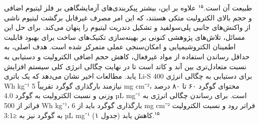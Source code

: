 \documentclass[12pt,a4paper,twocolumn]{article} %
\newcommand{\persian}[1]{\textfarsi{#1}}
\newcommand{\english}[1]{\textenglish{#1}}
\begin{document}
\persian{
طبیعت آن است.$^{۱۵}$ علاوه بر این، بیشتر پیکربندی‌های آزمایشگاهی بر فلز لیتیوم اضافی و حجم بالای الکترولیت متکی هستند، که این امر مصرف غیرقابل برگشت لیتیوم ناشی از واکنش‌های جانبی پلی‌سولفید و تشکیل دندریت لیتیوم را پنهان می‌کند. برای حل این مسائل، تلاش‌های پژوهشی کنونی بر بهینه‌سازی تکنیک‌های ساخت برای بهبود قابلیت اطمینان الکتروشیمیایی و امکان‌سنجی عملی متمرکز شده است. هدف اصلی، به حداقل رساندن استفاده از مواد غیرفعال، کاهش حجم اضافی الکترولیت و دستیابی به نسبت متعادل‌تری بین آند و کاتد است تا در نهایت چگالی انرژی کلی سیستم افزایش یابد. مطالعات اخیر نشان می‌دهد که یک باتری \english{Li-S} برای دستیابی به چگالی انرژی \english{400 Wh kg⁻¹} نیازمند بارگذاری گوگرد تقریباً \english{5 mg cm⁻²}، محتوای گوگرد ۶۰ تا ۸۰ درصد وزنی و نسبت الکترولیت به گوگرد \english{4.0 µL mg⁻¹} است. برای رساندن چگالی انرژی به فراتر از \english{500 Wh kg⁻¹}، بارگذاری گوگرد باید از \english{6 mg cm⁻²} فراتر رود و نسبت الکترولیت به گوگرد نیز به \english{≤3:1 µL mg⁻¹} کاهش یابد (جدول ۱).$^{۱۵}$
}
\end{document}
